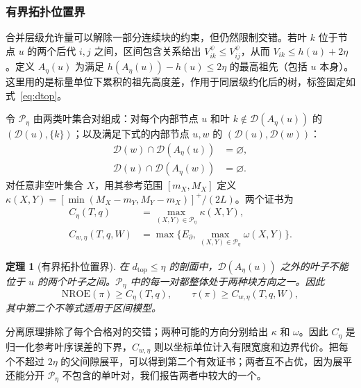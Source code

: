 \documentclass[fontset=none,zihao=5,a4paper]{ctexart}
\newtheorem{theorem}{定理}
\newcommand{\dtop}{d_{\mathrm{top}}}
\newcommand{\nroe}{\mathrm{NROE}}
\begin{document}
\subsubsection{有界拓扑位置界}
合并层级允许量可以解除一部分连续块的约束，但仍然限制交错。若叶 $k$ 位于节点 $u$ 的两个后代 $i,j$ 之间，区间包含关系给出 $V_{ik}^{\psi}\le V_{ij}^{\psi}$，从而 $V_{ik}\le h(u)+2\eta$。定义 $A_\eta(u)$ 为满足 $h(A_\eta(u))-h(u)\le2\eta$ 的最高祖先（包括 $u$ 本身）。这里用的是标量单位下累积的祖先高度差，作用于同层级约化后的树，标签固定如式~\eqref{eq:dtop}。

令 $\mathcal{P}_\eta$ 由两类叶集合对组成：对每个内部节点 $u$ 和叶 $k\notin\mathcal{D}(A_\eta(u))$ 的 $(\mathcal{D}(u),\{k\})$；以及满足下式的内部节点 $u,w$ 的 $(\mathcal{D}(u),\mathcal{D}(w))$：
\begin{equation}\label{eq:separatedpairs}
\begin{aligned}
 \mathcal{D}(w)\cap\mathcal{D}(A_\eta(u))&=\varnothing,\\
 \mathcal{D}(u)\cap\mathcal{D}(A_\eta(w))&=\varnothing.
\end{aligned}
\end{equation}
对任意非空叶集合 $X$，用其参考范围 $[m_X,M_X]$ 定义 $\kappa(X,Y)=[\min(M_X-m_Y,M_Y-m_X)]^+/(2L)$。两个证书为
\begin{equation}\label{eq:chaindef}
\begin{aligned}
 C_\eta(T,q)&=\max_{(X,Y)\in\mathcal{P}_\eta}\kappa(X,Y),\\
 C_{w,\eta}(T,q,W)&=\max\{E_\partial,\max_{(X,Y)\in\mathcal{P}_\eta}\omega(X,Y)\}.
\end{aligned}
\end{equation}
\begin{theorem}[有界拓扑位置界]\label{thm:chain}
在 $\dtop\le\eta$ 的剖面中，$\mathcal{D}(A_\eta(u))$ 之外的叶子不能位于 $u$ 的两个叶子之间。$\mathcal{P}_\eta$ 中的每一对都整体处于两种块方向之一。因此
\begin{equation}\label{eq:chainbounds}
 \nroe(\pi)\ge C_\eta(T,q),\qquad
 \tau(\pi)\ge C_{w,\eta}(T,q,W),
\end{equation}
其中第二个不等式适用于区间模型。
\end{theorem}
分离原理排除了每个合格对的交错；两种可能的方向分别给出 $\kappa$ 和 $\omega$。因此 $C_\eta$ 是归一化参考叶序误差的下界，$C_{w,\eta}$ 则以坐标单位计入有限宽度和边界代价。把每个不超过 $2\eta$ 的父间隙展平，可以得到第二个有效证书；两者互不占优，因为展平还能分开 $\mathcal{P}_\eta$ 不包含的单叶对，我们报告两者中较大的一个。
\end{document}
